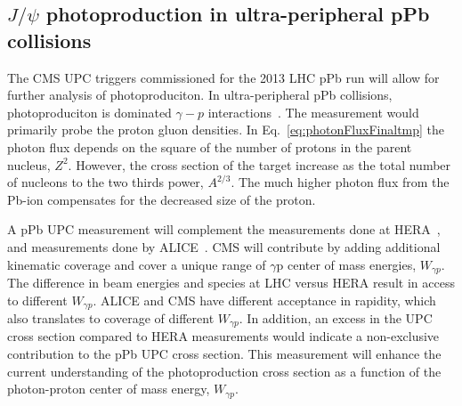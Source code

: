     \subsection{$J/\psi$ photoproduction in ultra-peripheral pPb collisions}
      The CMS UPC triggers commissioned for the 2013 LHC pPb run will allow for
        further analysis of \JPsi{} photoproduciton.
      In ultra-peripheral pPb collisions, \JPsi{} photoproduciton is dominated 
        $\gamma-p$ interactions~\cite{Frankfurt:2006tp,Guzey:2013taa}.
      The measurement would primarily probe the proton gluon densities.
      In Eq.~\ref{eq:photonFluxFinaltmp} the photon flux depends on the square
        of the number of protons in the parent nucleus, $Z^{2}$. 
      However, the cross section of the target increase as the total 
        number of nucleons to the two thirds power, $A^{2/3}$.
      The much higher photon flux from the Pb-ion compensates for 
        the decreased size of the proton.

      A pPb UPC \JPsi{} measurement will complement the measurements done at 
        HERA~\cite{Chekanov:2002xi,Aktas:2005xu,Alexa:2013xxa}, and measurements done by ALICE~\cite{TheALICE:2014dwa}.
      CMS will contribute by adding additional kinematic coverage and cover a 
        unique range of $\gamma$p center of mass energies, $W_{\gamma p}$. 
      The difference in beam energies and species at LHC versus HERA result in
        access to different $W_{\gamma p}$. 
      ALICE and CMS have different acceptance in \JPsi{} rapidity, which also 
        translates to coverage of different $W_{\gamma p}$.
      In addition, an excess in the UPC cross section compared to HERA 
        measurements would indicate a non-exclusive contribution to the pPb UPC 
        \JPsi{} cross section. 
      This measurement will enhance the current understanding of 
        the \JPsi{} photoproduction cross section as a function of the 
        photon-proton center of mass energy, $W_{\gamma p}$.
